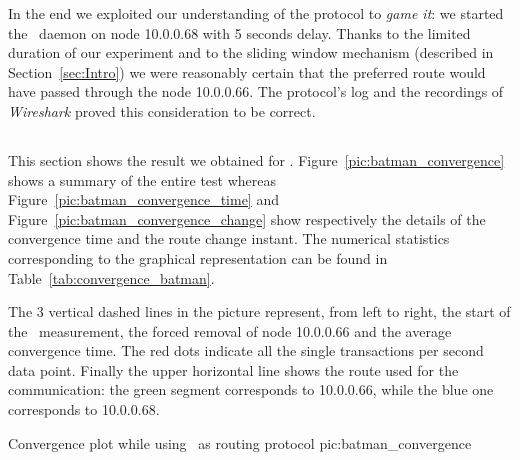     In the end we exploited our understanding of the protocol to
    \emph{game it}: we started the \batman\ daemon on node 10.0.0.68 with
    5 seconds delay. Thanks to the limited duration of our experiment and
    to the sliding window mechanism (described in Section~\ref{sec:Intro})
    we were reasonably certain that the preferred route would have passed
    through the node 10.0.0.66. The protocol's log and the recordings of
    \emph{Wireshark} proved this consideration to be correct.

\subsection{\batman}

    This section shows the result we obtained for \batman.
    Figure~\ref{pic:batman_convergence} shows a summary of the entire
    test whereas Figure~\ref{pic:batman_convergence_time} and
    Figure~\ref{pic:batman_convergence_change} show respectively the
    details of the convergence time and the route change instant. The
    numerical statistics corresponding to the graphical representation can
    be found in Table~\ref{tab:convergence_batman}.

    The 3 vertical dashed lines in the picture represent, from left to
    right, the start of the \netperf\ measurement, the forced removal of
    node 10.0.0.66 and the average convergence time. The red dots indicate
    all the single transactions per second data point. Finally the upper
    horizontal line shows the route used for the communication: the green
    segment corresponds to 10.0.0.66, while the blue one corresponds to
    10.0.0.68.

            {\textwidth}
            {Convergence plot while using \batman\ as routing protocol}
            {pic:batman_convergence}


